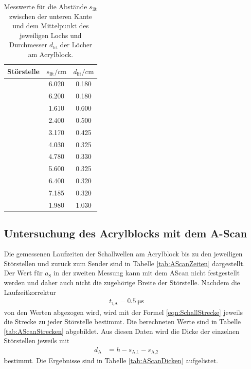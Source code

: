 \begin{table}[h]
  \centering
  \begin{tabular}{S S S}
    \toprule
    {Störstelle} & {$s_\text{lit}/\si{\centi\meter}$} & {$d_\text{lit}
    /\si{\centi\meter}$}\\
    \midrule
     & 6.020 & 0.180 \\
     & 6.200 & 0.180 \\
     & 1.610 & 0.600 \\
     & 2.400 & 0.500 \\
     & 3.170 & 0.425 \\
     & 4.030 & 0.325 \\
     & 4.780 & 0.330 \\
     & 5.600 & 0.325 \\
     & 6.400 & 0.320 \\
     & 7.185 & 0.320 \\
     & 1.980 & 1.030 \\
    \bottomrule
  \end{tabular}
  \caption{Messwerte für die Abstände $s_\text{lit}$ zwischen der unteren
  Kante und dem Mittelpunkt des jeweiligen Lochs und Durchmesser $d_\text{lit}$
  der Löcher am Acrylblock.}
  \label{tab:AbmessungenAcryl}
\end{table}

\subsection{Untersuchung des Acrylblocks mit dem A-Scan}

Die gemessenen Laufzeiten der Schallwellen am Acrylblock bis zu den jeweiligen
Störstellen und zurück zum Sender sind in Tabelle \ref{tab:AScanZeiten} dargestellt.
Der Wert für $a_8$ in der zweiten Messung kann mit dem AScan nicht festgestellt
werden und daher auch nicht die zugehörige Breite der Störstelle.
Nachdem die Laufzeitkorrektur
\begin{align}
  t_\text{l,A} = \SI{0.5}{\micro\second}
\end{align}
von den Werten abgezogen wird, wird mit der Formel \eqref{eqn:SchallStrecke}
jeweils die Strecke zu jeder Störstelle bestimmt.
Die berechneten Werte sind in Tabelle \ref{tab:AScanStrecken}
abgebildet.
Aus diesen Daten wird die Dicke der einzelnen Störstellen jeweils mit
\begin{align}
  d_\text{A} & = h - s_\text{A,1} - s_\text{A,2}
  \label{eqn:Dicke}
\end{align}
bestimmt. Die Ergebnisse sind in Tabelle \ref{tab:AScanDicken} aufgelistet.

